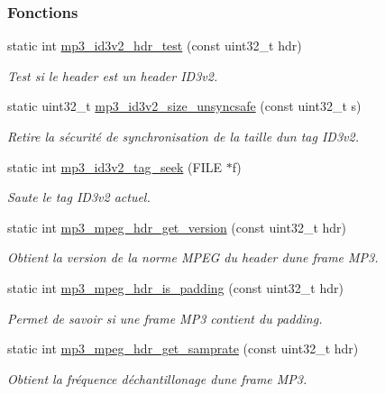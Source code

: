 \subsubsection*{Fonctions}
\begin{DoxyCompactItemize}
\item 
static int \hyperlink{a00086_ad5c1775e3137194eae404a93a564ab96}{mp3\+\_\+id3v2\+\_\+hdr\+\_\+test} (const uint32\+\_\+t hdr)
\begin{DoxyCompactList}\small\item\em Test si le header est un header I\+D3v2. \end{DoxyCompactList}\item 
static uint32\+\_\+t \hyperlink{a00086_a98007b4129951e18b3ba95b3d5ad973e}{mp3\+\_\+id3v2\+\_\+size\+\_\+unsyncsafe} (const uint32\+\_\+t s)
\begin{DoxyCompactList}\small\item\em Retire la sécurité de synchronisation de la taille d\textquotesingle{}un tag I\+D3v2. \end{DoxyCompactList}\item 
static int \hyperlink{a00086_acc4a0b82043fbdeadb8c669eda06d2cb}{mp3\+\_\+id3v2\+\_\+tag\+\_\+seek} (F\+I\+LE $\ast$f)
\begin{DoxyCompactList}\small\item\em Saute le tag I\+D3v2 actuel. \end{DoxyCompactList}\item 
static int \hyperlink{a00086_a2f08a046bc257029ca74b86b48204380}{mp3\+\_\+mpeg\+\_\+hdr\+\_\+get\+\_\+version} (const uint32\+\_\+t hdr)
\begin{DoxyCompactList}\small\item\em Obtient la version de la norme M\+P\+EG du header d\textquotesingle{}une frame M\+P3. \end{DoxyCompactList}\item 
static int \hyperlink{a00086_a407e3a1d9a7c3350620818a2ef19f142}{mp3\+\_\+mpeg\+\_\+hdr\+\_\+is\+\_\+padding} (const uint32\+\_\+t hdr)
\begin{DoxyCompactList}\small\item\em Permet de savoir si une frame M\+P3 contient du padding. \end{DoxyCompactList}\item 
static int \hyperlink{a00086_a85aeeafb97867c551e217ba3283e6fec}{mp3\+\_\+mpeg\+\_\+hdr\+\_\+get\+\_\+samprate} (const uint32\+\_\+t hdr)
\begin{DoxyCompactList}\small\item\em Obtient la fréquence d\textquotesingle{}échantillonage d\textquotesingle{}une frame M\+P3. \end{DoxyCompactList}\item 

\end{DoxyCompactItemize}
